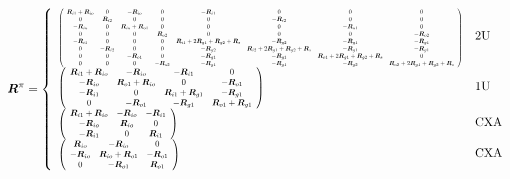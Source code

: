 \begin{equation}
\label{eqn:heat_exchange_term_R}
\bm{R}^\pi = \left\{ \begin{array}{ll}
\scalemath{0.5}{
\left( \begin{array}{cccccccc}
\bm{R}_{i1} + \bm{R}_{io} & 0 & -\bm{R}_{io} & 0 & -\bm{R}_{i1} & 0 & 0 & 0 \\
0 & \bm{R}_{i2} & 0 & 0 & 0 & -\bm{R}_{i2} & 0 & 0 \\
-\bm{R}_{io} & 0 & \bm{R}_{io} + \bm{R}_{o1} & 0 & 0 & 0 & -\bm{R}_{o1} & 0 \\
0 & 0 & 0 & \bm{R}_{o2} & 0 & 0 & 0 & -\bm{R}_{o2} \\
-\bm{R}_{i1} & 0 & 0 & 0 & \bm{R}_{i1}+2\bm{R}_{g1}+\bm{R}_{g2}+\bm{R}_{s} & -\bm{R}_{g2} & -\bm{R}_{g1} & -\bm{R}_{g1} \\
0 & -\bm{R}_{i2} & 0 & 0 & -\bm{R}_{g2} & \bm{R}_{i2}+2\bm{R}_{g1}+\bm{R}_{g2}+\bm{R}_{s} & -\bm{R}_{g1} & -\bm{R}_{g1} \\
0 & 0 & -\bm{R}_{o1} & 0 & -\bm{R}_{g1} & -\bm{R}_{g1} & \bm{R}_{o1}+2\bm{R}_{g1}+\bm{R}_{g2}+\bm{R}_{s} & 0 \\
0 & 0 & 0 & -\bm{R}_{o2} & -\bm{R}_{g1} & -\bm{R}_{g1} & -\bm{R}_{g2} & \bm{R}_{o2}+2\bm{R}_{g1}+\bm{R}_{g2}+\bm{R}_{s} \end{array} \right)
}
  & \mbox{2U} \\
\scalemath{0.7}{
\left( \begin{array}{cccc}
\bm{R}_{i1}+\bm{R}_{io} & -\bm{R}_{io} & -\bm{R}_{i1} & 0  \\
-\bm{R}_{io} & \bm{R}_{o1}+\bm{R}_{io} & 0 & -\bm{R}_{o1}  \\
-\bm{R}_{i1} & 0 & \bm{R}_{i1}+\bm{R}_{g1} & -\bm{R}_{g1}  \\
0 & -\bm{R}_{o1} & -\bm{R}_{g1} & \bm{R}_{o1}+\bm{R}_{g1}  \end{array} \right)
}
 & \mbox{1U} \\
\scalemath{0.7}{
\left( \begin{array}{ccc}
\bm{R}_{i1}+\bm{R}_{io} & -\bm{R}_{io} & -\bm{R}_{i1}  \\
-\bm{R}_{io} & \bm{R}_{io} & 0  \\
-\bm{R}_{i1} & 0 & \bm{R}_{i1}  \end{array} \right)
}
 & \mbox{CXA} \\
\scalemath{0.7}{
\left( \begin{array}{ccc}
\bm{R}_{io} & -\bm{R}_{io} & 0  \\
-\bm{R}_{io} & \bm{R}_{io}+\bm{R}_{o1} & -\bm{R}_{o1}  \\
0 & -\bm{R}_{o1} & \bm{R}_{o1}  \end{array} \right)
}
 & \mbox{CXA} 
       \end{array} \right.
\end{equation}
